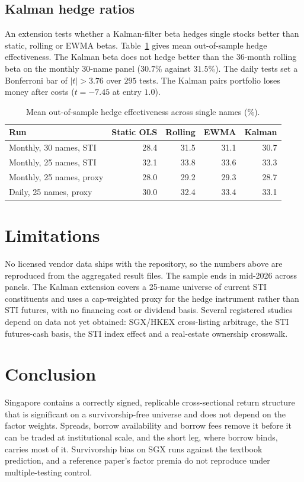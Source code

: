 \documentclass[11pt,a4paper]{article}
\begin{document}
\subsection{Kalman hedge ratios}
An extension tests whether a Kalman-filter beta hedges single stocks better than static, rolling or EWMA betas. Table~\ref{tab:kal} gives mean out-of-sample hedge effectiveness. The Kalman beta does not hedge better than the 36-month rolling beta on the monthly 30-name panel ($30.7$\% against $31.5$\%). The daily tests set a Bonferroni bar of $|t|>3.76$ over $295$ tests. The Kalman pairs portfolio loses money after costs ($t=-7.45$ at entry $1.0$).

\begin{table}[h]
\centering
\caption{Mean out-of-sample hedge effectiveness across single names (\%).}
\label{tab:kal}
\begin{tabular}{lrrrr}
\toprule
Run & Static OLS & Rolling & EWMA & Kalman \\
\midrule
Monthly, 30 names, STI & 28.4 & 31.5 & 31.1 & 30.7 \\
Monthly, 25 names, STI & 32.1 & 33.8 & 33.6 & 33.3 \\
Monthly, 25 names, proxy & 28.0 & 29.2 & 29.3 & 28.7 \\
Daily, 25 names, proxy & 30.0 & 32.4 & 33.4 & 33.1 \\
\bottomrule
\end{tabular}
\end{table}

\section{Limitations}
No licensed vendor data ships with the repository, so the numbers above are reproduced from the aggregated result files. The sample ends in mid-2026 across panels. The Kalman extension covers a 25-name universe of current STI constituents and uses a cap-weighted proxy for the hedge instrument rather than STI futures, with no financing cost or dividend basis. Several registered studies depend on data not yet obtained: SGX/HKEX cross-listing arbitrage, the STI futures-cash basis, the STI index effect and a real-estate ownership crosswalk.

\section{Conclusion}
Singapore contains a correctly signed, replicable cross-sectional return structure that is significant on a survivorship-free universe and does not depend on the factor weights. Spreads, borrow availability and borrow fees remove it before it can be traded at institutional scale, and the short leg, where borrow binds, carries most of it. Survivorship bias on SGX runs against the textbook prediction, and a reference paper's factor premia do not reproduce under multiple-testing control.
\end{document}
